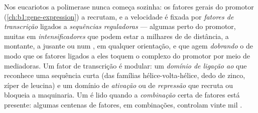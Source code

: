 \begin{definition}\label{def:b1:expression-control:enhancer}
Nos eucariotos a polimerase nunca começa sozinha: os fatores gerais do
promotor (\cref{ch:b1:gene-expression}) a recrutam, e a velocidade é
fixada por \emph{fatores de transcrição} ligados a
\emph{sequências reguladoras} --- algumas perto do promotor, muitas em
\emph{intensificadores} que podem estar a milhares de  de
distância, a montante, a jusante ou num , em qualquer orientação,
e que agem \emph{dobrando} o  de modo que os fatores ligados a eles
toquem o complexo do promotor por meio de  mediadoras. Um fator
de transcrição é modular: um \emph{domínio de ligação ao } que
reconhece uma sequência curta (das famílias hélice-volta-hélice, dedo de
zinco, zíper de leucina) e um domínio de \emph{ativação} ou de
\emph{repressão} que recruta ou bloqueia a maquinaria. Um  é lido
quando a \emph{combinação} certa de fatores está presente: algumas
centenas de fatores, em combinações, controlam vinte mil .
\end{definition}

